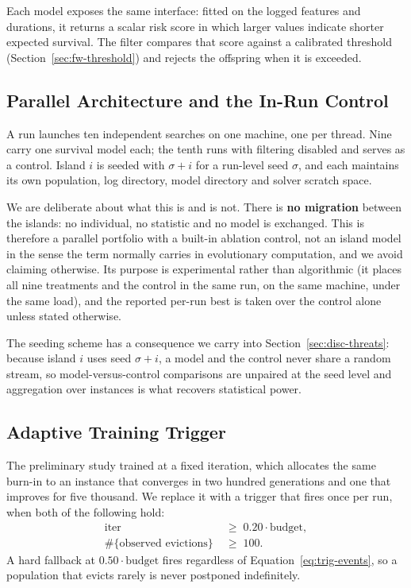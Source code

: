 \documentclass[a4paper,fleqn]{cas-dc}
\begin{document}
Each model exposes the same interface: fitted on the logged features and
durations, it returns a scalar risk score in which larger values indicate
shorter expected survival. The filter compares that score against a calibrated
threshold (Section~\ref{sec:fw-threshold}) and rejects the offspring when it is
exceeded.

\subsection{Parallel Architecture and the In-Run Control}\label{sec:fw-islands}

A run launches ten independent searches on one machine, one per thread. Nine
carry one survival model each; the tenth runs with filtering disabled and serves
as a control. Island $i$ is seeded with $\sigma + i$ for a run-level seed
$\sigma$, and each maintains its own population, log directory, model directory
and solver scratch space.

We are deliberate about what this is and is not. There is \textbf{no migration}
between the islands: no individual, no statistic and no model is exchanged. This
is therefore a parallel portfolio with a built-in ablation control, not an island
model in the sense the term normally carries in evolutionary computation, and we
avoid claiming otherwise. Its purpose is experimental rather than algorithmic
(it places all nine treatments and the control in the same run, on the same
machine, under the same load), and the reported per-run best is taken over the
control alone unless stated otherwise.

The seeding scheme has a consequence we carry into
Section~\ref{sec:disc-threats}: because island $i$ uses seed $\sigma + i$, a
model and the control never share a random stream, so model-versus-control
comparisons are unpaired at the seed level and aggregation over instances is
what recovers statistical power.

\subsection{Adaptive Training Trigger}\label{sec:fw-trigger}

The preliminary study trained at a fixed iteration, which allocates the same
burn-in to an instance that converges in two hundred generations and one that
improves for five thousand. We replace it with a trigger that fires once per
run, when both of the following hold:
\begin{align}
\text{iter} &\;\geq\; 0.20 \cdot \text{budget}, \label{eq:trig-budget}\\
\#\{\text{observed evictions}\} &\;\geq\; 100. \label{eq:trig-events}
\end{align}
A hard fallback at $0.50 \cdot \text{budget}$ fires regardless of
Equation~\eqref{eq:trig-events}, so a population that evicts rarely is never
postponed indefinitely.
\end{document}
